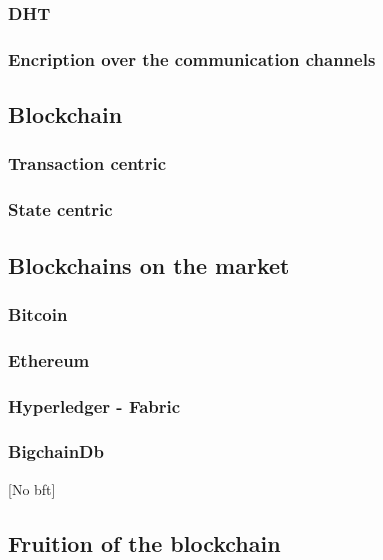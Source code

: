 \subsubsection{DHT}

\subsubsection{Encription over the communication channels}




\subsection{Blockchain}


\subsubsection{Transaction centric}
\subsubsection{State centric}



\subsection{Blockchains on the market}

\subsubsection{Bitcoin}

\subsubsection{Ethereum}

\subsubsection{Hyperledger - Fabric}

\subsubsection{BigchainDb}
[No bft]



\subsection{Fruition of the blockchain}

